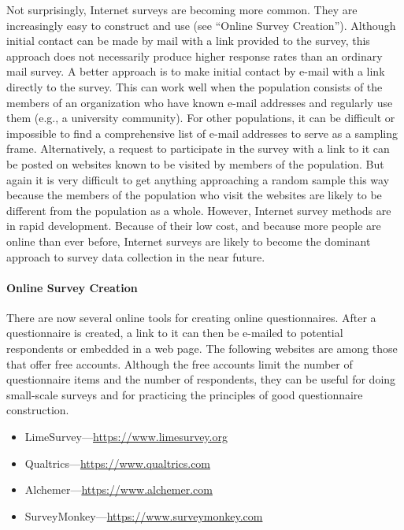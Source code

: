 \documentclass[
]{krantz}
\providecommand{\tightlist}{%
  \setlength{\itemsep}{0pt}\setlength{\parskip}{0pt}}
\begin{document}
Not surprisingly, Internet surveys are becoming more common. They are increasingly easy to construct and use (see ``Online Survey Creation''). Although initial contact can be made by mail with a link provided to the survey, this approach does not necessarily produce higher response rates than an ordinary mail survey. A better approach is to make initial contact by e-mail with a link directly to the survey. This can work well when the population consists of the members of an organization who have known e-mail addresses and regularly use them (e.g., a university community). For other populations, it can be difficult or impossible to find a comprehensive list of e-mail addresses to serve as a sampling frame. Alternatively, a request to participate in the survey with a link to it can be posted on websites known to be visited by members of the population. But again it is very difficult to get anything approaching a random sample this way because the members of the population who visit the websites are likely to be different from the population as a whole. However, Internet survey methods are in rapid development. Because of their low cost, and because more people are online than ever before, Internet surveys are likely to become the dominant approach to survey data collection in the near future.

\hypertarget{online-survey-creation}{%
\paragraph*{Online Survey Creation}\label{online-survey-creation}}

There are now several online tools for creating online questionnaires. After a questionnaire is created, a link to it can then be e-mailed to potential respondents or embedded in a web page. The following websites are among those that offer free accounts. Although the free accounts limit the number of questionnaire items and the number of respondents, they can be useful for doing small-scale surveys and for practicing the principles of good questionnaire construction.

\begin{itemize}
\tightlist
\item
  LimeSurvey---\url{https://www.limesurvey.org}
\item
  Qualtrics---\url{https://www.qualtrics.com}
\item
  Alchemer---\url{https://www.alchemer.com}
\item
  SurveyMonkey---\url{https://www.surveymonkey.com}
\end{itemize}
\end{document}
